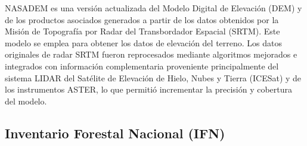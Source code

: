 NASADEM \cite{nasadem_data} es una versión actualizada del Modelo Digital de Elevación (DEM) y de los productos asociados generados a partir de los datos obtenidos por la Misión de Topografía por Radar del Transbordador Espacial (SRTM). Este modelo se emplea para obtener los datos de elevación del terreno. Los datos originales de radar SRTM fueron reprocesados mediante algoritmos mejorados e integrados con información complementaria proveniente principalmente del sistema LIDAR del Satélite de Elevación de Hielo, Nubes y Tierra (ICESat) y de los instrumentos ASTER, lo que permitió incrementar la precisión y cobertura del modelo.

\begin{table}[H]
    \renewcommand{\arraystretch}{2.5} %
    
    \centering
    \caption{Columnas empleadas de los datasets de NASADEM}
    \label{tab:nasadem}
\end{table}

\subsection{Inventario Forestal Nacional (IFN)}\label{section:tablas_ifn}



